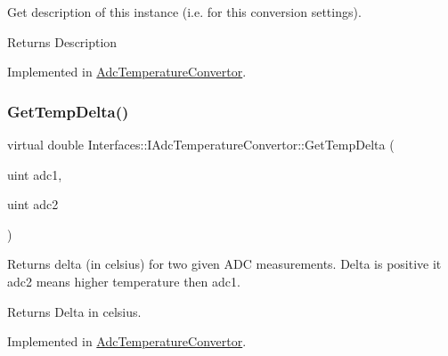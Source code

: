 Get description of this instance (i.\+e. for this conversion settings). 

\begin{DoxyReturn}{Returns}
Description 
\end{DoxyReturn}


Implemented in \hyperlink{class_adc_temperature_convertor_ad82afdddbac46a95b6da44e769180d10}{Adc\+Temperature\+Convertor}.

\mbox{\label{class_interfaces_1_1_i_adc_temperature_convertor_a70d62425963cadadd88db1d7028bf722}} 
\subsubsection{\texorpdfstring{Get\+Temp\+Delta()}{GetTempDelta()}}
{\footnotesize\ttfamily virtual double Interfaces\+::\+I\+Adc\+Temperature\+Convertor\+::\+Get\+Temp\+Delta (\begin{DoxyParamCaption}\item[{uint}]{adc1,  }\item[{uint}]{adc2 }\end{DoxyParamCaption})\hspace{0.3cm}{\ttfamily [pure virtual]}}



Returns delta (in celsius) for two given A\+DC measurements. Delta is positive it adc2 means higher temperature then adc1. 

\begin{DoxyReturn}{Returns}
Delta in celsius. 
\end{DoxyReturn}


Implemented in \hyperlink{class_adc_temperature_convertor_a6742f0177d4dcd1aab1087b5d7512146}{Adc\+Temperature\+Convertor}.

\mbox{\label{class_interfaces_1_1_i_adc_temperature_convertor_a3b1d84ea243b62a36238f16433668a23}} 
